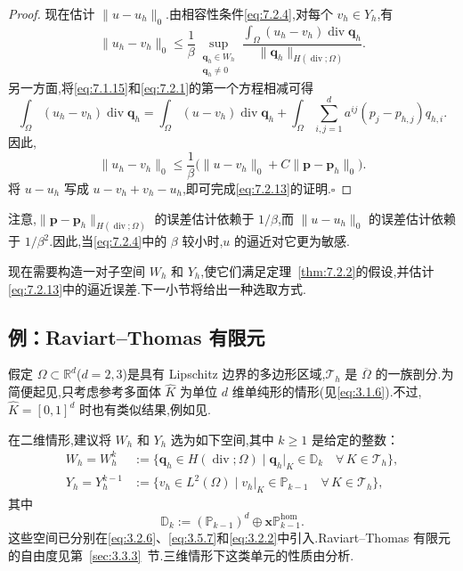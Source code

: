 \begin{proof}
现在估计 \(\|u-u_h\|_0\).由相容性条件\eqref{eq:7.2.4},对每个 \(v_h\in Y_h\),有
\[
  \|u_h-v_h\|_0\le\frac1\beta
    \sup_{\substack{\boldsymbol{q}_h\in W_h\\\boldsymbol{q}_h\ne0}}
    \frac{\int_\Omega(u_h-v_h)\operatorname{div}\boldsymbol{q}_h}
         {\|\boldsymbol{q}_h\|_{H(\operatorname{div};\Omega)}}.
\]
另一方面,将\eqref{eq:7.1.15}和\eqref{eq:7.2.1}的第一个方程相减可得
\[
  \int_\Omega(u_h-v_h)\operatorname{div}\boldsymbol{q}_h
     =\int_\Omega(u-v_h)\operatorname{div}\boldsymbol{q}_h
       +\int_\Omega\sum_{i,j=1}^d a^{ij}(p_j-p_{h,j})q_{h,i}.
\]
因此,
\[
  \|u_h-v_h\|_0\le\frac1\beta\bigl(\|u-v_h\|_0+C\|\boldsymbol{p}-\boldsymbol{p}_h\|_0\bigr).
\]
将 \(u-u_h\) 写成 \(u-v_h+v_h-u_h\),即可完成\eqref{eq:7.2.13}的证明.\hfill\(\square\)
\end{proof}

注意,\(\|\boldsymbol{p}-\boldsymbol{p}_h\|_{H(\operatorname{div};\Omega)}\) 的误差估计依赖于 \(1/\beta\),而 \(\|u-u_h\|_0\) 的误差估计依赖于 \(1/\beta^2\).因此,当\eqref{eq:7.2.4}中的 \(\beta\) 较小时,\(u\) 的逼近对它更为敏感.

现在需要构造一对子空间 \(W_h\) 和 \(Y_h\),使它们满足定理~\ref{thm:7.2.2}的假设,并估计\eqref{eq:7.2.13}中的逼近误差.下一小节将给出一种选取方式.

\subsection{例：Raviart--Thomas 有限元}\label{sec:7.2.2}

假定 \(\Omega\subset\mathbb R^d\)(\(d=2,3\))是具有 Lipschitz 边界的多边形区域,\(\mathcal T_h\) 是 \(\overline\Omega\) 的一族剖分.为简便起见,只考虑参考多面体 \(\widehat K\) 为单位 \(d\) 维单纯形的情形(见\eqref{eq:3.1.6}).不过,\(\widehat K=[0,1]^d\) 时也有类似结果,例如见.

在二维情形,建议将 \(W_h\) 和 \(Y_h\) 选为如下空间,其中 \(k\ge1\) 是给定的整数：
\begin{align}
  W_h=W_h^k&:=\{\boldsymbol{q}_h\in H(\operatorname{div};\Omega)\mid
      \boldsymbol{q}_h|_K\in\mathbb D_k\quad\forall\,K\in\mathcal T_h\},\label{eq:7.2.19}\\
  Y_h=Y_h^{k-1}&:=\{v_h\in L^2(\Omega)\mid
      v_h|_K\in\mathbb P_{k-1}\quad\forall\,K\in\mathcal T_h\},\label{eq:7.2.20}
\end{align}
其中
\begin{equation}\label{eq:7.2.21}
  \mathbb D_k:=(\mathbb P_{k-1})^d\oplus\boldsymbol{x}\mathbb P_{k-1}^{\mathrm{hom}}.
\end{equation}
这些空间已分别在\eqref{eq:3.2.6}、\eqref{eq:3.5.7}和\eqref{eq:3.2.2}中引入.Raviart--Thomas 有限元的自由度见第~\ref{sec:3.3.3}~节.三维情形下这类单元的性质由分析.

